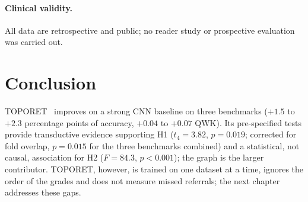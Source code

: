 \paragraph{Clinical validity.}
All data are retrospective and public; no reader study or prospective evaluation was
carried out.

\section*{Conclusion}

TOPORET~\cite{belhadj2025plos} improves on a strong CNN baseline on three benchmarks
($+1.5$ to $+2.3$ percentage points of accuracy, $+0.04$ to $+0.07$ QWK). Its pre-specified
tests provide transductive evidence supporting H1 ($t_4=3.82$, $p=0.019$; corrected for
fold overlap, $p=0.015$ for the three benchmarks combined) and a statistical, not causal,
association for H2 ($F=84.3$, $p<0.001$); the graph is the larger contributor. TOPORET, however, is trained on one dataset at a time, ignores the order of the grades
and does not measure missed referrals; the next chapter addresses these gaps.
